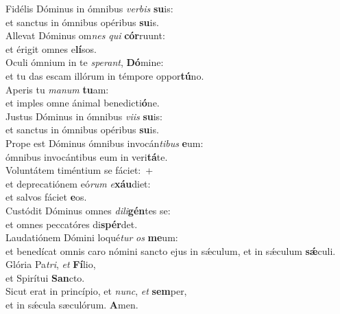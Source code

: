 \evenverse Fidélis Dóminus in ómnibus \textit{ver}\textit{bis} \textbf{su}is:~\*\\
\evenverse et sanctus in ómnibus opéribus \textbf{su}is.\\
\oddverse Allevat Dóminus om\textit{nes} \textit{qui} \textbf{cór}ruunt:~\*\\
\oddverse et érigit omnes e\textbf{lí}sos.\\
\evenverse Oculi ómnium in te \textit{spe}\textit{rant}, \textbf{Dó}mine:~\*\\
\evenverse et tu das escam illórum in témpore oppor\textbf{tú}no.\\
\oddverse Aperis tu \textit{ma}\textit{num} \textbf{tu}am:~\*\\
\oddverse et imples omne ánimal benedicti\textbf{ó}ne.\\
\evenverse Justus Dóminus in ómnibus \textit{vi}\textit{is} \textbf{su}is:~\*\\
\evenverse et sanctus in ómnibus opéribus \textbf{su}is.\\
\oddverse Prope est Dóminus ómnibus invocán\textit{ti}\textit{bus} \textbf{e}um:~\*\\
\oddverse ómnibus invocántibus eum in veri\textbf{tá}te.\\
\evenverse Voluntátem timéntium se fáciet:~+\\
\evenverse  et deprecatiónem eó\textit{rum} \textit{e}\textbf{xáu}diet:~\*\\
\evenverse et salvos fáciet \textbf{e}os.\\
\oddverse Custódit Dóminus omnes \textit{di}\textit{li}\textbf{gén}tes se:~\*\\
\oddverse et omnes peccatóres di\textbf{spér}det.\\
\evenverse Laudatiónem Dómini loqué\textit{tur} \textit{os} \textbf{me}um:~\*\\
\evenverse et benedícat omnis caro nómini sancto ejus in sǽculum, et in sǽculum \textbf{sǽ}culi.\\
\oddverse Glória Pa\textit{tri}, \textit{et} \textbf{Fí}lio,~\*\\
\oddverse et Spirítui \textbf{San}cto.\\
\evenverse Sicut erat in princípio, et \textit{nunc}, \textit{et} \textbf{sem}per,~\*\\
\evenverse et in sǽcula sæculórum. \textbf{A}men.\\
